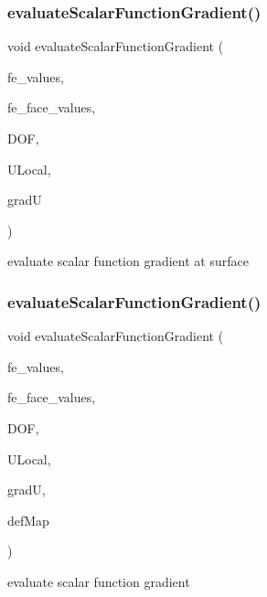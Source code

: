 \subsubsection{\texorpdfstring{evaluate\+Scalar\+Function\+Gradient()}{evaluateScalarFunctionGradient()}\hspace{0.1cm}{\footnotesize\ttfamily [3/4]}}
{\footnotesize\ttfamily void evaluate\+Scalar\+Function\+Gradient (\begin{DoxyParamCaption}\item[{const F\+E\+Values$<$ dim $>$ \&}]{fe\+\_\+values,  }\item[{const F\+E\+Face\+Values$<$ dim $>$ \&}]{fe\+\_\+face\+\_\+values,  }\item[{unsigned int}]{D\+OF,  }\item[{Table$<$ 1, T $>$ \&}]{U\+Local,  }\item[{Table$<$ 2, T $>$ \&}]{gradU }\end{DoxyParamCaption})}

evaluate scalar function gradient at surface \mbox{\label{group___evaluation_functions_gabedd4ae2841d2332ed0df0513b189e34}} 
\subsubsection{\texorpdfstring{evaluate\+Scalar\+Function\+Gradient()}{evaluateScalarFunctionGradient()}\hspace{0.1cm}{\footnotesize\ttfamily [4/4]}}
{\footnotesize\ttfamily void evaluate\+Scalar\+Function\+Gradient (\begin{DoxyParamCaption}\item[{const F\+E\+Values$<$ dim $>$ \&}]{fe\+\_\+values,  }\item[{const F\+E\+Face\+Values$<$ dim $>$ \&}]{fe\+\_\+face\+\_\+values,  }\item[{unsigned int}]{D\+OF,  }\item[{Table$<$ 1, T $>$ \&}]{U\+Local,  }\item[{Table$<$ 2, T $>$ \&}]{gradU,  }\item[{\mbox{\hyperlink{structdeformation_map}{deformation\+Map}}$<$ T, dim $>$ \&}]{def\+Map }\end{DoxyParamCaption})}

evaluate scalar function gradient \mbox{\label{group___evaluation_functions_gadb862d9530a60b8ce5255222778ceeb6}} 
